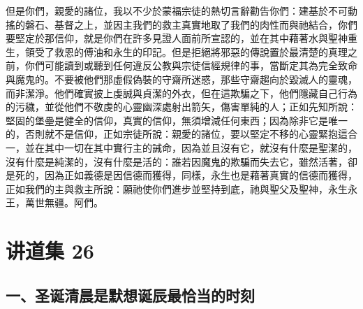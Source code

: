 但是你們，親愛的諸位，我以不少於蒙福宗徒的熱切言辭勸告你們：建基於不可動搖的磐石、基督之上，並因主我們的救主真實地取了我們的肉性而與祂結合，你們要堅定於那信仰，就是你們在許多見證人面前所宣認的，並在其中藉著水與聖神重生，領受了救恩的傅油和永生的印記。但是拒絕將邪惡的傳說置於最清楚的真理之前，你們可能讀到或聽到任何違反公教與宗徒信經規律的事，當斷定其為完全致命與魔鬼的。不要被他們那虛假偽裝的守齋所迷惑，那些守齋趨向於毀滅人的靈魂，而非潔淨。他們確實披上虔誠與貞潔的外衣，但在這欺騙之下，他們隱藏自己行為的污穢，並從他們不敬虔的心靈幽深處射出箭矢，傷害單純的人；正如先知所說：堅固的堡壘是健全的信仰，真實的信仰，無須增減任何東西；因為除非它是唯一的，否則就不是信仰，正如宗徒所說：親愛的諸位，要以堅定不移的心靈緊抱這合一，並在其中一切在其中實行主的誡命，因為並且沒有它，就沒有什麼是聖潔的，沒有什麼是純潔的，沒有什麼是活的：誰若因魔鬼的欺騙而失去它，雖然活著，卻是死的，因為正如義德是因信德而獲得，同樣，永生也是藉著真實的信德而獲得，正如我們的主與救主所說：願祂使你們進步並堅持到底，祂與聖父及聖神，永生永王，萬世無疆。阿們。\par



\section{讲道集 26}

\par


\subsection{一、圣诞清晨是默想诞辰最恰当的时刻}

